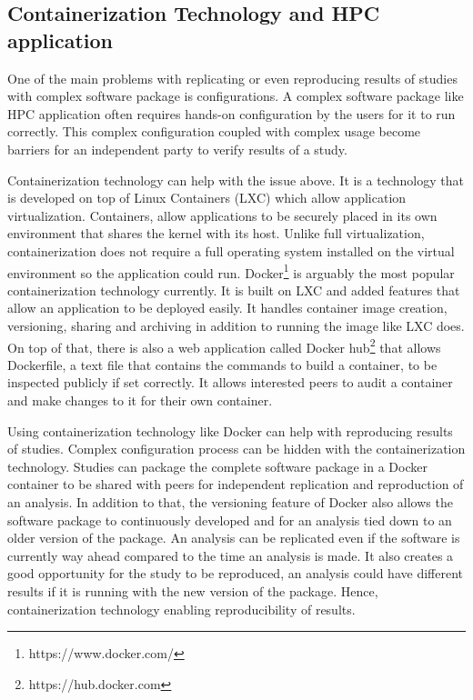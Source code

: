 \subsection{Containerization Technology and HPC application}




One of the main problems with replicating or even reproducing results of studies with complex software package is configurations. A complex software package like HPC application often requires hands-on configuration by the users for it to run correctly. This complex configuration coupled with complex usage become barriers for an independent party to verify results of a study.

Containerization technology can help with the issue above. It is a technology that is developed on top of Linux Containers (LXC) which allow application virtualization. Containers, allow applications to be securely placed in its own environment that shares the kernel with its host. Unlike full virtualization, containerization does not require a full operating system installed on the virtual environment so the application could run. Docker\footnote{https://www.docker.com/} is arguably the most popular containerization technology currently. It is built on LXC and added features that allow an application to be deployed easily. It handles container image creation, versioning, sharing and archiving in addition to running the image like LXC does. On top of that, there is also a web application called Docker hub\footnote{https://hub.docker.com} that allows Dockerfile, a text file that contains the commands to build a container, to be inspected publicly if set correctly. It allows interested peers to audit a container and make changes to it for their own container.

Using containerization technology like Docker can help with reproducing results of studies. Complex configuration process can be hidden with the containerization technology. Studies can package the complete software package in a Docker container to be shared with peers for independent replication and reproduction of an analysis. In addition to that, the versioning feature of Docker also allows the software package to continuously developed and for an analysis tied down to an older version of the package. An analysis can be replicated even if the software is currently way ahead compared to the time an analysis is made. It  also creates a good opportunity for the study to be reproduced, an analysis could have different results if it is running with the new version of the package. Hence, containerization technology enabling reproducibility of results.


